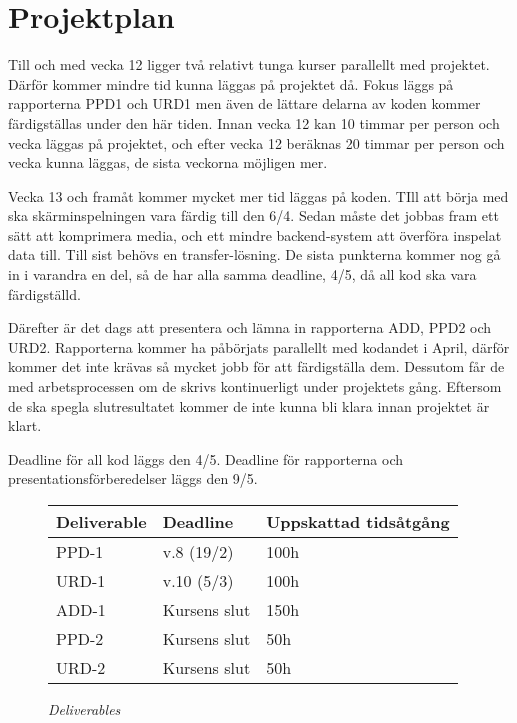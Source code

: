 
\section{Projektplan}
Till och med vecka 12 ligger två relativt tunga kurser parallellt med projektet. Därför kommer mindre tid kunna läggas på projektet då. Fokus läggs på rapporterna PPD1 och URD1 men även de lättare delarna av koden kommer färdigställas under den här tiden. Innan vecka 12 kan 10 timmar per person och vecka läggas på projektet, och efter vecka 12 beräknas 20 timmar per person och vecka kunna läggas, de sista veckorna möjligen mer.

Vecka 13 och framåt kommer mycket mer tid läggas på koden. TIll att börja med ska skärminspelningen vara färdig till den 6/4. Sedan måste det jobbas fram ett sätt att komprimera media, och ett mindre backend-system att överföra inspelat data till. Till sist behövs en transfer-lösning. De sista punkterna kommer nog gå in i varandra en del, så de har alla samma deadline, 4/5, då all kod ska vara färdigställd. 

Därefter är det dags att presentera och lämna in rapporterna ADD, PPD2 och URD2. Rapporterna kommer ha påbörjats parallellt med kodandet i April, därför kommer det inte krävas så mycket jobb för att färdigställa dem. Dessutom får de med arbetsprocessen om de skrivs kontinuerligt under projektets gång. Eftersom de ska spegla slutresultatet kommer de inte kunna bli klara innan projektet är klart. 

Deadline för all kod läggs den 4/5. Deadline för rapporterna och presentationsförberedelser läggs den 9/5. 

\begin{figure}[H]
\centering
\begin{tabular}{ | l | l | l |}
  \hline
  \textbf{Deliverable} & \textbf{Deadline} & \textbf{Uppskattad tidsåtgång} \\ \hline
  PPD-1 & v.8 (19/2) & 100h \\ \hline
  URD-1 & v.10 (5/3) & 100h \\ \hline
  ADD-1 & Kursens slut & 150h \\ \hline
  PPD-2 & Kursens slut & 50h \\ \hline
  URD-2 & Kursens slut & 50h \\ \hline
\end{tabular}
\caption*{\textit{Deliverables}}
\end{figure}

